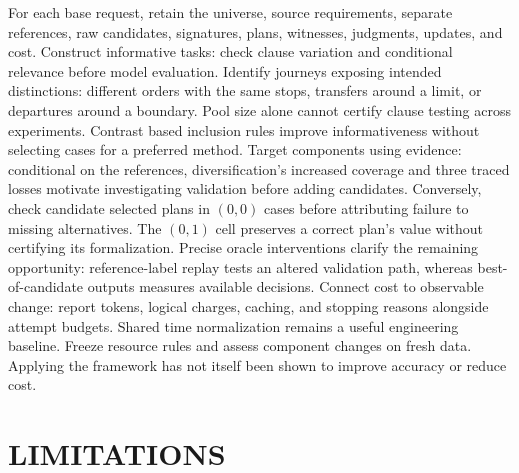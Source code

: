 \documentclass[a4paper,twoside]{article}
\begin{document}
\noindent For each base request, retain the universe, source requirements, separate references, raw candidates, signatures, plans, witnesses, judgments, updates, and cost. 
Construct informative tasks: check clause variation and conditional relevance before model evaluation. Identify journeys exposing intended distinctions: different orders with the same stops, transfers around a limit, or departures around a boundary. Pool size alone cannot certify clause testing across experiments. Contrast based inclusion rules improve informativeness without selecting cases for a preferred method.
Target components using evidence: conditional on the references, diversification's increased coverage and three traced losses motivate investigating validation before adding candidates. Conversely, check candidate selected plans in $(0,0)$ cases before attributing failure to missing alternatives.
The $(0,1)$ cell preserves a correct plan's value without certifying its formalization. Precise oracle interventions clarify the remaining opportunity: reference-label replay tests an altered validation path, whereas best-of-candidate outputs measures available decisions.
Connect cost to observable change: report tokens, logical charges, caching, and stopping reasons alongside attempt budgets. Shared time normalization remains a useful engineering baseline. Freeze resource rules and assess component changes on fresh data.
Applying the framework has not itself been shown to improve accuracy or reduce cost.



\section{\uppercase{Limitations}}
\label{sec:limitations}
\end{document}
